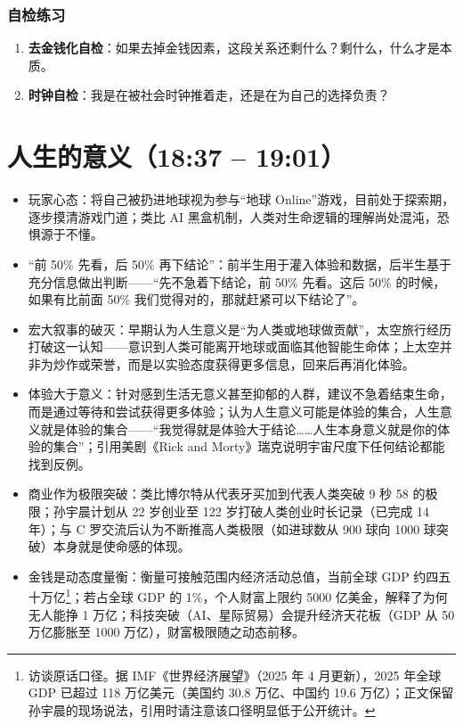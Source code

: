 \subsubsection{自检练习}

\begin{enumerate}
\def\labelenumi{\arabic{enumi}.}
\tightlist
\item
  \textbf{去金钱化自检}：如果去掉金钱因素，这段关系还剩什么？剩什么，什么才是本质。
\item
  \textbf{时钟自检}：我是在被社会时钟推着走，还是在为自己的选择负责？
\end{enumerate}

\section{人生的意义（18:37 --
19:01）}

\begin{itemize}
\tightlist
\item
  玩家心态：将自己被扔进地球视为参与``地球
  Online''游戏，目前处于探索期，逐步摸清游戏门道；类比 AI
  黑盒机制，人类对生命逻辑的理解尚处混沌，恐惧源于不懂。
\item
  ``前 50\% 先看，后 50\%
  再下结论''：前半生用于灌入体验和数据，后半生基于充分信息做出判断------``先不急着下结论，前
  50\% 先看。这后 50\% 的时候，如果有比前面 50\%
  我们觉得对的，那就赶紧可以下结论了''。
\item
  宏大叙事的破灭：早期认为人生意义是``为人类或地球做贡献''，太空旅行经历打破这一认知------意识到人类可能离开地球或面临其他智能生命体；上太空并非为炒作或荣誉，而是以实验态度获得更多信息，回来后再消化体验。
\item
  体验大于意义：针对感到生活无意义甚至抑郁的人群，建议不急着结束生命，而是通过等待和尝试获得更多体验；认为人生意义可能是体验的集合，人生意义就是体验的集合------``我觉得就是体验大于结论\ldots\ldots 人生本身意义就是你的体验的集合''；引用美剧《Rick
  and Morty》瑞克说明宇宙尺度下任何结论都能找到反例。
\item
  商业作为极限突破：类比博尔特从代表牙买加到代表人类突破 9 秒 58
  的极限；孙宇晨计划从 22 岁创业至 122 岁打破人类创业时长记录（已完成 14
  年）；与 C 罗交流后认为不断推高人类极限（如进球数从 900 球向 1000
  球突破）本身就是使命感的体现。
\item
  金钱是动态度量衡：衡量可接触范围内经济活动总值，当前全球 GDP
  约四五十万亿\footnote{访谈原话口径。据 IMF《世界经济展望》（2025 年 4
    月更新），2025 年全球 GDP 已超过 118 万亿美元（美国约 30.8
    万亿、中国约 19.6
    万亿）；正文保留孙宇晨的现场说法，引用时请注意该口径明显低于公开统计。}；若占全球
  GDP 的 1\%，个人财富上限约 5000 亿美金，解释了为何无人能挣 1
  万亿；科技突破（AI、星际贸易）会提升经济天花板（GDP 从 50 万亿膨胀至
  1000 万亿），财富极限随之动态前移。
\end{itemize}

